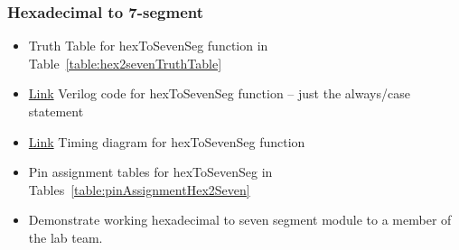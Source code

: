 \subsubsection{Hexadecimal to 7-segment}
\begin{itemize}
    \item  Truth Table for hexToSevenSeg function in Table~\ref{table:hex2sevenTruthTable}
    \item \protect\hyperlink{Hex2Seven_Verilog}{Link} Verilog code for hexToSevenSeg function -- just the
        always/case statement
    \item \protect\hyperlink{Hex2Seven_Waveform}{Link} Timing diagram for hexToSevenSeg function
    \item Pin assignment tables for hexToSevenSeg  in Tables~\ref{table:pinAssignmentHex2Seven}
    \item Demonstrate working hexadecimal to seven segment module to a member of the lab team.
\end{itemize}
